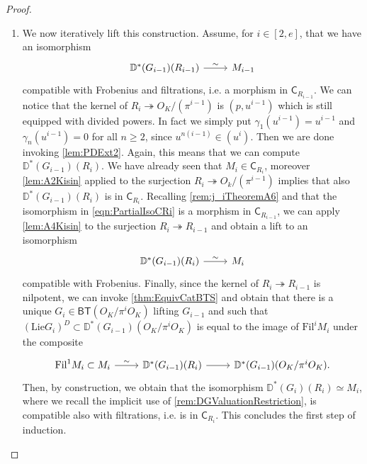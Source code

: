 \begin{proof}
\begin{enumerate}
\item We now iteratively lift this construction.
	Assume, for $i \in [2,e]$, that we have an isomorphism
	\begin{equation}\label{eqn:PartialIsoCRi}
	\begin{tikzcd}
	\mathbb{D}^*(G_{i-1})(R_{i-1}) 
	\arrow[r, "\sim", rightarrow] &
	M_{i-1}
	\end{tikzcd}
	\end{equation}
	compatible with Frobenius and filtrations, i.e. a morphism in $\mathsf{C}_{R_{i-1}}$.
	We can notice that the kernel of $R_i \twoheadrightarrow O_K/ (\pi^{i-1})$
	is $(p, u^{i-1})$ which is still equipped with divided powers.
	In fact we simply put $\gamma_1(u^{i-1}) = u^{i-1}$ and
	$\gamma_n(u^{i-1}) = 0$ for all $n \geq 2$,
	since $u^{n(i-1)} \in (u^i)$.
	Then we are done invoking \cref{lem:PDExt2}.
	Again, this means that we can compute $\mathbb{D}^*(G_{i-1})(R_i)$.
	We have already seen that $M_i \in \mathsf{C}_{R_i}$, moreover \cref{lem:A2Kisin}
	applied to the surjection $R_i \twoheadrightarrow O_k/ (\pi^{i-1})$ implies that
	also $\mathbb{D}^*(G_{i-1})(R_i)$ is in $\mathsf{C}_{R_i}$.
	Recalling \cref{rem:j_iTheoremA6} and that the isomorphism in \cref{eqn:PartialIsoCRi}
	is a morphism in $\mathsf{C}_{R_{i-1}}$, 
	we can apply \cref{lem:A4Kisin} to the surjection $R_i \twoheadrightarrow R_{i-1}$
	and obtain a lift to an isomorphism
	\begin{equation*}
	\begin{tikzcd}
	\mathbb{D}^*(G_{i-1})(R_{i}) 
	\arrow[r, "\sim", rightarrow] &
	M_{i}
	\end{tikzcd}
	\end{equation*}
	compatible with Frobenius.
	Finally, since the kernel of $R_i \twoheadrightarrow R_{i-1}$ is nilpotent,
	we can invoke \cref{thm:EquivCatBTS} and obtain that
	there is a unique $G_i \in \mathsf{BT}(O_K/\pi^iO_K)$
	lifting $G_{i-1}$ and such that $(\mathrm{Lie}G_i)^D \subset \mathbb{D}^*(G_{i-1})(O_K/\pi^i O_K)$
	is equal to the image of $\mathrm{Fil}^i M_i$ under the composite
	\begin{equation*}
	\begin{tikzcd}
		\mathrm{Fil}^1 M_i \subset M_i
		\arrow[r, "\sim", rightarrow] &
		\mathbb{D}^*(G_{i-1})(R_i)
		\arrow[r, "", rightarrow] &
		\mathbb{D}^*(G_{i-1})(O_K/\pi^iO_K)
	.\end{tikzcd}
	\end{equation*}
	Then, by construction, we obtain that the isomorphism
	$\mathbb{D}^*(G_i)(R_i) \simeq M_i$, where we recall the implicit use of 
	\cref{rem:DGValuationRestriction}, is compatible also with filtrations,
	i.e. is in $\mathsf{C}_{R_i}$.
	This concludes the first step of induction.


\end{enumerate}
\end{proof}
